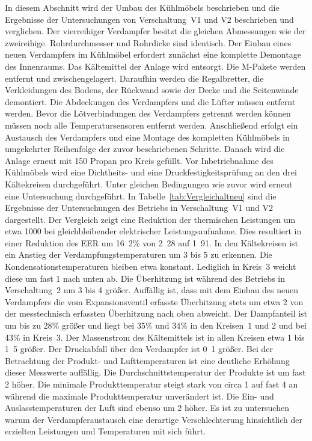 In diesem Abschnitt wird der Umbau des Kühlmöbels beschrieben und die Ergebnisse der Untersuchungen von Verschaltung~V1 und V2 beschrieben und verglichen. Der vierreihiger Verdampfer besitzt die gleichen Abmessungen wie der zweireihige. Rohrdurchmesser und Rohrdicke sind identisch. Der Einbau eines neuen Verdampfers im Kühlmöbel erfordert zunächst eine komplette Demontage des Innenraums. Das Kältemittel der Anlage wird entsorgt. Die M-Pakete werden entfernt und zwischengelagert. Daraufhin werden die Regalbretter, die Verkleidungen des Bodens, der Rückwand sowie der Decke und die Seitenwände demontiert. Die Abdeckungen des Verdampfers und die Lüfter müssen entfernt werden. Bevor die Lötverbindungen des Verdampfers getrennt werden können müssen noch alle Temperatursensoren entfernt werden. Anschließend erfolgt ein Austausch des Verdampfers und eine Montage des kompletten Kühlmöbels in umgekehrter Reihenfolge der zuvor beschriebenen Schritte. Danach wird die Anlage erneut mit \unit{150}{\gram} Propan pro Kreis gefüllt. Vor Inbetriebnahme des Kühlmöbels wird eine Dichtheits- und eine Druckfestigkeitsprüfung an den drei Kältekreisen durchgeführt. Unter gleichen Bedingungen wie zuvor wird erneut eine Untersuchung durchgeführt. \newline 
In Tabelle~\ref{tab:Vergleichaltneu} sind die Ergebnisse der Untersuchungen des Betriebs in Verschaltung~V1 und V2 dargestellt.
Der Vergleich zeigt eine Reduktion der thermischen Leistungen um etwa \unit{1000}{\watt} bei gleichbleibender elektrischer Leistungsaufnahme. Dies resultiert in einer Reduktion des EER um \unit{16.2}{\%} von \unit{2.28}{} auf \unit{1.91}{}. In den Kältekreisen ist ein Anstieg der Verdampfungstemperaturen um \unit{3}{\kelvin} bis \unit{5}{\kelvin} zu erkennen. Die Kondensationstemperaturen bleiben etwa konstant. Lediglich in Kreis~3 weicht diese um fast \unit{1}{\kelvin} nach unten ab. Die Überhitzung ist während des Betriebs in Verschaltung~2 um \unit{3}{\kelvin} bis \unit{4}{\kelvin} größer. Auffällig ist, dass mit dem Einbau des neuen Verdampfers die vom Expansionsventil erfasste Überhitzung stets um etwa \unit{2}{\kelvin} von der messtechnisch erfassten Überhitzung nach oben abweicht. Der Dampfanteil ist um bis zu \unit{28}{\%} größer und liegt bei \unit{35}{\%} und \unit{34}{\%} in den Kreisen~1 und 2 und bei \unit{43}{\%} in Kreis~3. Der Massenstrom des Kältemittels ist in allen Kreisen etwa \unit{1}{\gram\per\second} bis \unit{1.5}{\gram\per\second} größer. Der Druckabfall über den Verdampfer ist \unit{0.1}{\bbar} größer. \newline
Bei der Betrachtung der Produkt- und Lufttemperaturen ist eine deutliche Erhöhung dieser Messwerte auffällig. Die Durchschnittstemperatur der Produkte ist um fast \unit{2}{\kelvin} höher. Die minimale Produkttemperatur steigt stark von circa \unit{1}{\celsius} auf fast \unit{4}{\celsius} an während die maximale Produkttemperatur unverändert ist. Die Ein- und Auslasstemperaturen der Luft sind ebenso um \unit{2}{\kelvin} höher. \newline
Es ist zu untersuchen warum der Verdampferaustausch eine derartige Verschlechterung hinsichtlich der erzielten Leistungen und Temperaturen mit sich führt.


